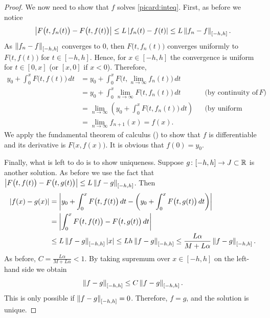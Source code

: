 \begin{proof}
We now need to show that $f$ solves \eqref{picard:inteq}.
First, as before we notice
\begin{equation*}
\left\lvert {F\bigl(t,f_{n}(t)\bigr) - 
F\bigl(t,f(t)\bigr)} \right\rvert
\leq
L \left\lvert {f_n(t)-f(t)} \right\rvert
\leq
L \left\lVert {f_n-f} \right\rVert_{[-h,h]} .
\end{equation*}
As $\left\lVert {f_n-f} \right\rVert_{[-h,h]}$ converges to 0, then
$F\bigl(t,f_n(t)\bigr)$ converges uniformly to $F\bigl(t,f(t)\bigr)$
for $t \in [-h,h]$.  Hence, for $x \in [-h,h]$
the convergence is uniform %
for $t \in [0,x]$ (or $[x,0]$ if $x < 0$).  Therefore,
\begin{align*}
y_0
+
\int_0^{x}
F(t,f(t)\bigr)\,dt
& =
y_0
+
\int_0^{x}
F\bigl(t,\lim_{n\to\infty} f_n(t)\bigr)\,dt
& &
\\
& =
y_0
+
\int_0^{x}
\lim_{n\to\infty} F\bigl(t,f_n(t)\bigr)\,dt
& & \text{(by continuity of } F\text{)}
\\
& =
\lim_{n\to\infty} 
\left(
y_0
+
\int_0^{x}
F\bigl(t,f_n(t)\bigr)\,dt
\right)
& & \text{(by uniform convergence)}
\\
& =
\lim_{n\to\infty} 
f_{n+1}(x)
=
f(x) .
& &
\end{align*}
We apply the fundamental theorem of calculus () to show that
$f$ is differentiable and its derivative is $F\bigl(x,f(x)\bigr)$.  It is obvious
that $f(0) = y_0$.

Finally, what is left to do is to show uniqueness.  Suppose $g \colon [-h,h]
\to J \subset {\mathbb{R}}$ is another solution.
As before we use the fact that
$\left\lvert {F\bigl(t,f(t)\bigr) - F\bigl(t,g(t)\bigr)} \right\rvert \leq L \left\lVert {f-g} \right\rVert_{[-h,h]}$.
Then
\begin{equation*}
\begin{split}
\left\lvert {f(x)-g(x)} \right\rvert
& =
\left\lvert {
y_0
+
\int_0^{x}
F\bigl(t,f(t)\bigr)\,dt
-
\left(
y_0
+
\int_0^{x}
F\bigl(t,g(t)\bigr)\,dt
\right)
} \right\rvert
\\
& =
\left\lvert {
\int_0^{x}
F\bigl(t,f(t)\bigr)
-
F\bigl(t,g(t)\bigr)\,dt
} \right\rvert
\\
& \leq
L\left\lVert {f-g} \right\rVert_{[-h,h]}\left\lvert {x} \right\rvert
\leq
Lh\left\lVert {f-g} \right\rVert_{[-h,h]}
\leq
\frac{L\alpha}{M+L\alpha}\left\lVert {f-g} \right\rVert_{[-h,h]} .
\end{split}
\end{equation*}
As 
before, $C = \frac{L\alpha}{M+L\alpha} < 1$.  By taking supremum over $x \in
[-h,h]$ on the
left-hand side we obtain
\begin{equation*}
\left\lVert {f-g} \right\rVert_{[-h,h]} \leq C \left\lVert {f-g} \right\rVert_{[-h,h]} .
\end{equation*}
This is only possible if $\left\lVert {f-g} \right\rVert_{[-h,h]} = 0$.  Therefore, $f=g$, and the
solution is unique.
\end{proof}

